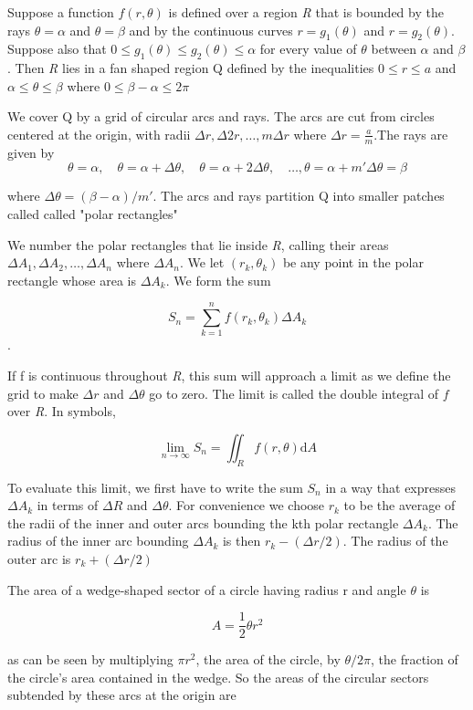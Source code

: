 \documentclass[12pt,a4paper,draft]{article}
\begin{document}
Suppose a function \(f(r, \theta)\) is defined over a region \textit{R} that is bounded by the rays \(\theta = \alpha\) and \(\theta = \beta\) and by the continuous curves \(r = g_1(\theta)\) and \(r = g_2(\theta)\).
Suppose also that \(0 \leq g_1(\theta) \leq g_2(\theta) \leq \alpha\) for every value of \(\theta\) between \(\alpha\) and \(\beta\). Then \textit{R} lies in a fan shaped region Q defined by the inequalities \(0 \leq r \leq a\) and \(\alpha \leq \theta \leq \beta\) where \(0 \leq \beta - \alpha \leq 2 \pi\)


We cover Q by a grid of circular arcs and rays. The arcs are cut from circles centered at the origin, with radii \(\Delta r, \Delta 2r, \dots , m \Delta r\) where \(\Delta r = \frac{a}{m}\).The rays are given by
\[\theta = \alpha, \quad \theta = \alpha + \Delta \theta, \quad \theta = \alpha + 2 \Delta \theta , \quad \dots, \theta = \alpha + m' \Delta \theta = \beta\]

where \(\Delta \theta = (\beta - \alpha) / m'\). The arcs and rays partition Q into smaller patches called called "polar rectangles" 

We number the polar rectangles that lie inside \textit{R}, calling their areas \(\Delta A_1, \Delta A_2 , \dots , \Delta A_n\) where \(\Delta A_n\). We let \((r_k, \theta_k)\) be any point in the polar rectangle whose area is \(\Delta A_k\). We form the sum

\[S_n = \sum_{k=1}^{n} f(r_k,\theta_k) \Delta A_k\].

If f is continuous throughout \textit{R}, this sum will approach a limit as we define the grid to make \(\Delta r\) and \(\Delta \theta\) go to zero. The limit is called the double integral of \(f\) over \textit{R}. In symbols,

\[\lim_{n \to \infty} S_n = \iint_R f(r, \theta) \mathrm{d}A\]


To evaluate this limit, we first have to write the sum \(S_n\) in a way that expresses \(\Delta A_k\) in terms of \(\Delta R\) and \(\Delta \theta\). For convenience we choose \(r_k\) to be the average of the radii of the inner and outer arcs bounding the kth polar rectangle \(\Delta A_k\). The radius of the inner arc bounding \(\Delta A_k\) is then \(r_k - (\Delta r / 2)\).
The radius of the outer arc is \(r_k + (\Delta r / 2)\)

The area of a wedge-shaped sector of a circle having radius r and angle \(\theta\) is 

\[A = \frac{1}{2} \theta r^2\]

as can be seen by multiplying \(\pi r^2\), the area of the circle, by \(\theta / 2 \pi\), the fraction of the circle's area contained in the wedge. So the areas of the circular sectors subtended by these arcs at the origin are
\end{document}

